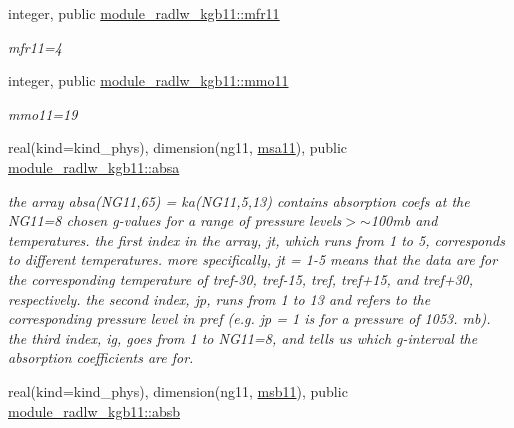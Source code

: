 \begin{DoxyCompactItemize}
\mbox{\label{group__module__radlw__kgbnn_ga9b5764441999cce52bc02e65a24420b9}} 
integer, public \hyperlink{group__module__radlw__kgbnn_ga9b5764441999cce52bc02e65a24420b9}{module\+\_\+radlw\+\_\+kgb11\+::mfr11}
\begin{DoxyCompactList}\small\item\em mfr11=4 \end{DoxyCompactList}\item 
\mbox{\label{group__module__radlw__kgbnn_ga6aabd24aa785ef8689c63b01aaaab243}} 
integer, public \hyperlink{group__module__radlw__kgbnn_ga6aabd24aa785ef8689c63b01aaaab243}{module\+\_\+radlw\+\_\+kgb11\+::mmo11}
\begin{DoxyCompactList}\small\item\em mmo11=19 \end{DoxyCompactList}\item 
\mbox{\label{group__module__radlw__kgbnn_ga7ac883387aa86a635c9aea011c55a1d5}} 
real(kind=kind\+\_\+phys), dimension(ng11, \hyperlink{namespacemodule__radlw__kgb11_afd15a7b87b3d49c53c12e023c604b360}{msa11}), public \hyperlink{group__module__radlw__kgbnn_ga7ac883387aa86a635c9aea011c55a1d5}{module\+\_\+radlw\+\_\+kgb11\+::absa}
\begin{DoxyCompactList}\small\item\em the array absa(\+N\+G11,65) = ka(\+N\+G11,5,13) contains absorption coefs at the N\+G11=8 chosen g-\/values for a range of pressure levels$>$$\sim$100mb and temperatures. the first index in the array, jt, which runs from 1 to 5, corresponds to different temperatures. more specifically, jt = 1-\/5 means that the data are for the corresponding temperature of tref-\/30, tref-\/15, tref, tref+15, and tref+30, respectively. the second index, jp, runs from 1 to 13 and refers to the corresponding pressure level in pref (e.\+g. jp = 1 is for a pressure of 1053. mb). the third index, ig, goes from 1 to N\+G11=8, and tells us which g-\/interval the absorption coefficients are for. \end{DoxyCompactList}\item 
\mbox{\label{group__module__radlw__kgbnn_gacf37465675961812e07616e42b137d70}} 
real(kind=kind\+\_\+phys), dimension(ng11, \hyperlink{group__module__radlw__kgbnn_gaa8630868015cb7e358107e6418e35276}{msb11}), public \hyperlink{group__module__radlw__kgbnn_gacf37465675961812e07616e42b137d70}{module\+\_\+radlw\+\_\+kgb11\+::absb}

\end{DoxyCompactItemize}
